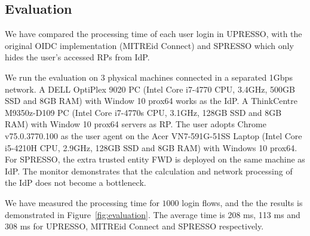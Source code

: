 \subsection{Evaluation}
\label{sec:evaluation}
We have compared the processing time of each user login in UPRESSO, with the original OIDC implementation (MITREid Connect) and SPRESSO which only hides the user's accessed RPs from IdP.

 We run the evaluation on 3 physical machines connected in a separated 1Gbps network. A DELL OptiPlex 9020 PC (Intel Core i7-4770 CPU, 3.4GHz, 500GB SSD and 8GB RAM) with Window 10 prox64 works as the IdP. A ThinkCentre M9350z-D109 PC (Intel Core i7-4770s CPU, 3.1GHz, 128GB SSD and 8GB RAM) with  Window 10 prox64 servers as RP. The user adopts Chrome v75.0.3770.100 as the user agent on the Acer VN7-591G-51SS Laptop (Intel Core i5-4210H CPU, 2.9GHz, 128GB SSD and 8GB RAM) with  Windows 10 prox64. For SPRESSO, the extra trusted entity FWD is deployed on the same machine as IdP. The monitor demonstrates that  the calculation and network processing of the IdP does not become a bottleneck.

 We have measured the processing time for $1000$ login flows, and the the results is demonstrated in Figure~\ref{fig:evaluation}. The average time is 208 ms, 113 ms and 308 ms for UPRESSO, MITREid Connect and SPRESSO respectively.

